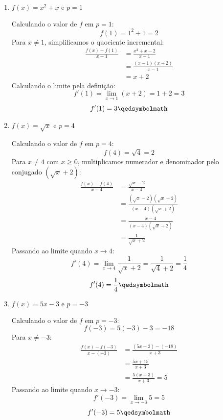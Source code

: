 \begin{enumerate}[label=\alph*)]
    \item $f(x) = x^2 + x$ e $p = 1$

    Calculando o valor de $f$ em $p = 1$:
    \[
    f(1) = 1^2 + 1 = 2
    \]
    Para $x \neq 1$, simplificamos o quociente incremental:
    \begin{align*}
        \frac{f(x) - f(1)}{x - 1} &= \frac{x^2 + x - 2}{x - 1} \\[0.25cm]
        &= \frac{(x - 1)(x + 2)}{x - 1} \\[0.25cm]
        &= x + 2
    \end{align*}
    Calculando o limite pela definição:
    \[
    f'(1) = \lim_{x \to 1} (x + 2) = 1 + 2 = 3
    \]
    \[
    f'(1) = 3 \qedsymbolmath
    \]

    \item $f(x) = \sqrt{x}$ e $p = 4$

    Calculando o valor de $f$ em $p = 4$:
    \[
    f(4) = \sqrt{4} = 2
    \]
    Para $x \neq 4$ com $x \ge 0$, multiplicamos numerador e denominador pelo conjugado $(\sqrt{x} + 2)$:
    \begin{align*}
        \frac{f(x) - f(4)}{x - 4} &= \frac{\sqrt{x} - 2}{x - 4} \\[0.25cm]
        &= \frac{(\sqrt{x} - 2)(\sqrt{x} + 2)}{(x - 4)(\sqrt{x} + 2)} \\[0.25cm]
        &= \frac{x - 4}{(x - 4)(\sqrt{x} + 2)} \\[0.25cm]
        &= \frac{1}{\sqrt{x} + 2}
    \end{align*}
    Passando ao limite quando $x \to 4$:
    \[
    f'(4) = \lim_{x \to 4} \frac{1}{\sqrt{x} + 2} = \frac{1}{\sqrt{4} + 2} = \frac{1}{4}
    \]
    \[
    f'(4) = \frac{1}{4} \qedsymbolmath
    \]

    \item $f(x) = 5x - 3$ e $p = -3$

    Calculando o valor de $f$ em $p = -3$:
    \[
    f(-3) = 5(-3) - 3 = -18
    \]
    Para $x \neq -3$:
    \begin{align*}
        \frac{f(x) - f(-3)}{x - (-3)} &= \frac{(5x - 3) - (-18)}{x + 3} \\[0.25cm]
        &= \frac{5x + 15}{x + 3} \\[0.25cm]
        &= \frac{5(x + 3)}{x + 3} = 5
    \end{align*}
    Passando ao limite quando $x \to -3$:
    \[
    f'(-3) = \lim_{x \to -3} 5 = 5
    \]
    \[
    f'(-3) = 5 \qedsymbolmath
    \]


\end{enumerate}
